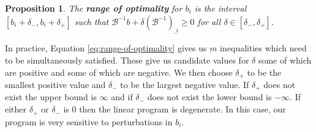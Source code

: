 \documentclass[
]{book}
\newtheorem{proposition}{Proposition}[chapter]
\theoremstyle{definition}
\theoremstyle{definition}
\theoremstyle{definition}
\theoremstyle{definition}
\theoremstyle{remark}
\begin{document}
\begin{proposition}
The \textbf{range of optimality} for \(b_i\) is the interval \([b_i + \delta_-, b_i + \delta_+]\) such that \(\mathcal{B}^{-1} b + \delta (\mathcal{B}^{-1})_{\_i} \ge 0\) for all \(\delta \in [\delta_-, \delta_+]\).
\end{proposition}

In practice, Equation \eqref{eq:range-of-optimality} gives us \(m\) inequalities which need to be simultaneously satisfied. These give us candidate values for \(\delta\) some of which are positive and some of which are negative. We then choose \(\delta_+\) to be the smallest positive value and \(\delta_-\) to be the largest negative value. If \(\delta_+\) does not exist the upper bound is \(\infty\) and if \(\delta_-\) does not exist the lower bound is \(-\infty\). If either \(\delta_+\) or \(\delta_-\) is 0 then the linear program is degenerate. In this case, our program is very sensitive to perturbations in \(b_i\).
\end{document}
